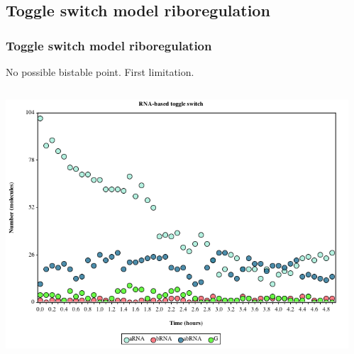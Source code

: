\documentclass{beamer}
\begin{document}

%


\subsection{Toggle switch model riboregulation}
\begin{frame}
  \frametitle{Toggle switch model riboregulation}

No possible bistable point. First limitation.

\begin{columns}[T]
    \begin{column}{0.5\textwidth}
      \centering
       \includegraphics[scale=0.3]{RNA_based_toggle_timecourse.png}
    \end{column}
    \begin{column}{0.5\textwidth}
      \centering
    \end{column}
  \end{columns}
\end{frame}
\end{document}

